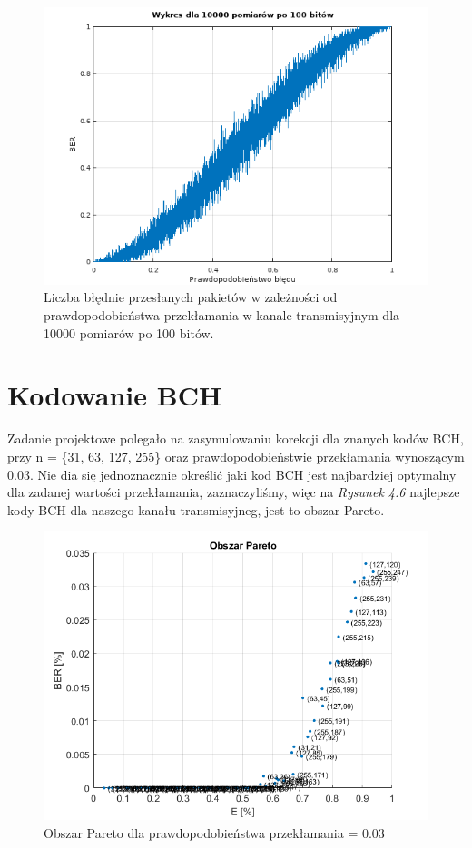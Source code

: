 \documentclass[12pt,a4paper,notitlepage]{report}
\begin{document}
    \begin{figure}[H]
        \centering       
        \includegraphics[width=\textwidth]{10000_po_100.png}
        \caption{Liczba błędnie przesłanych pakietów w zależności od prawdopodobieństwa przekłamania w kanale transmisyjnym dla 10000 pomiarów po 100 bitów.}
        \label{fig:obrazek 10000_po_100}
    \end{figure}
    \section{Kodowanie BCH}
    Zadanie projektowe polegało na zasymulowaniu korekcji dla znanych kodów BCH, przy n = \{31, 63, 127, 255\} oraz prawdopodobieństwie przekłamania wynoszącym 0.03. Nie dia się jednoznacznie określić jaki kod BCH jest najbardziej optymalny dla zadanej wartości przekłamania, zaznaczyliśmy, więc na \textit{Rysunek 4.6} najlepsze kody BCH dla naszego kanału transmisyjneg, jest to obszar Pareto.
    \begin{figure}[H]
        \centering       
        \includegraphics[width=\textwidth]{pareto.png}
        \caption{Obszar Pareto dla prawdopodobieństwa przekłamania = 0.03}
        \label{fig:pareto}
    \end{figure}
\end{document}
